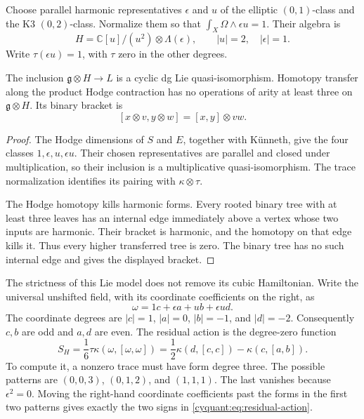 Choose parallel harmonic representatives $\epsilon$ and $u$ of the
elliptic $(0,1)$-class and the K3 $(0,2)$-class.  Normalize them so that
$\int_X\Omega\wedge\epsilon u=1$.  Their algebra is
\begin{equation}\label{cyquant:eq:harmonic-algebra}
 H=\mathbb C[u]/(u^2)\otimes\Lambda(\epsilon),
 \qquad |u|=2,\quad |\epsilon|=1.
\end{equation}
Write $\tau(\epsilon u)=1$, with $\tau$ zero in the other degrees.

\begin{proposition}\label{cyquant:prop:strict-harmonic}
The inclusion $\mathfrak g\otimes H\longrightarrow L$ is a cyclic
dg Lie quasi-isomorphism.  Homotopy transfer along the product Hodge
contraction has no operations of arity at least three on
$\mathfrak g\otimes H$.  Its binary bracket is
\[
 [x\otimes v,y\otimes w]=[x,y]\otimes vw.
\]
\end{proposition}

\begin{proof}
The Hodge dimensions of $S$ and $E$, together with K\"unneth, give the
four classes $1,\epsilon,u,\epsilon u$.  Their chosen representatives are
parallel and closed under multiplication, so their inclusion is a
multiplicative quasi-isomorphism.  The trace normalization identifies its
pairing with $\kappa\otimes\tau$.

The Hodge homotopy kills harmonic forms.  Every rooted binary tree with
at least three leaves has an internal edge immediately above a vertex
whose two inputs are harmonic.  Their bracket is harmonic, and the
homotopy on that edge kills it.  Thus every higher transferred tree is
zero.  The binary tree has no such internal edge and gives the displayed
bracket.
\end{proof}

The strictness of this Lie model does not remove its cubic Hamiltonian.
Write the universal unshifted field, with its coordinate coefficients on
the right, as
\[
 \omega=1c+\epsilon a+ub+\epsilon u d.
\]
The coordinate degrees are $|c|=1$, $|a|=0$, $|b|=-1$, and $|d|=-2$.
Consequently $c,b$ are odd and $a,d$ are even.  The residual action is the
degree-zero function
\begin{equation}\label{cyquant:eq:residual-action}
 S_H=\frac16\tau\kappa(\omega,[\omega,\omega])
     =\frac12\kappa(d,[c,c])-\kappa(c,[a,b]).
\end{equation}
To compute it, a nonzero trace must have form degree three.  The possible
patterns are $(0,0,3)$, $(0,1,2)$, and $(1,1,1)$.  The last vanishes
because $\epsilon^2=0$.  Moving the right-hand coordinate coefficients
past the forms in the first two patterns gives exactly the two signs in
\eqref{cyquant:eq:residual-action}.


